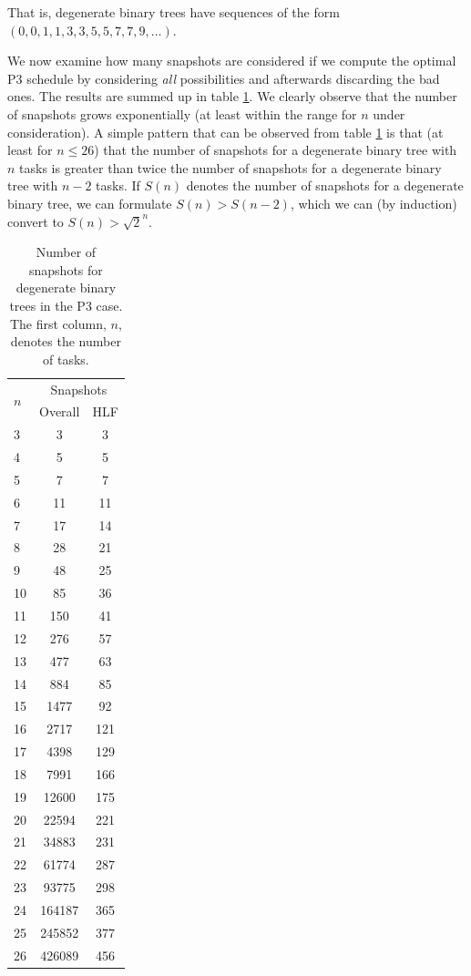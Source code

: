 That is, degenerate binary trees have sequences of the form $(0,0,1,1,3,3,5,5,7,7,9,\dots)$.

We now examine how many snapshots are considered if we compute the optimal P3 schedule by considering \emph{all} possibilities and afterwards discarding the bad ones. The results are summed up in table \ref{tab:p3-degenerate-binary-trees-no-snapshots}. We clearly observe that the number of snapshots grows exponentially (at least within the range for $n$ under consideration). A simple pattern that can be observed from table \ref{tab:p3-degenerate-binary-trees-no-snapshots} is that (at least for $n\leq 26$) that the number of snapshots for a degenerate binary tree with $n$ tasks is greater than twice the number of snapshots for a degenerate binary tree with $n-2$ tasks. If $S(n)$ denotes the number of snapshots for a degenerate binary tree, we can formulate $S(n)>S(n-2)$, which we can (by induction) convert to $S(n) > \sqrt 2 ^ n$.

\begin{table}[t]
  \centering
  \begin{tabular}[ht]{lcc}
    \multirow{2}{*}{$n$} & \multicolumn{2}{c}{Snapshots} \\
     & Overall & HLF \\
    \hline
    3  &  3       & 3   \\
    4  &  5       & 5   \\
    5  &  7       & 7   \\
    6  &  11      & 11  \\
    7  &  17      & 14  \\
    8  &  28      & 21  \\
    9  &  48      & 25  \\
    10 &  85      & 36  \\
    11 &  150     & 41  \\
    12 &  276     & 57  \\
    13 &  477     & 63  \\
    14 &  884     & 85  \\
    15 &  1477    & 92  \\
    16 &  2717    & 121 \\
    17 &  4398    & 129 \\
    18 &  7991    & 166 \\
    19 &  12600   & 175 \\
    20 &  22594   & 221 \\
    21 &  34883   & 231 \\
    22 &  61774   & 287 \\
    23 &  93775   & 298 \\
    24 &  164187  & 365 \\
    25 &  245852  & 377 \\
    26 &  426089  & 456 \\
  \end{tabular}
  \caption{Number of snapshots for degenerate binary trees in the P3 case. The first column, $n$, denotes the number of tasks.}
  \label{tab:p3-degenerate-binary-trees-no-snapshots}
\end{table}

